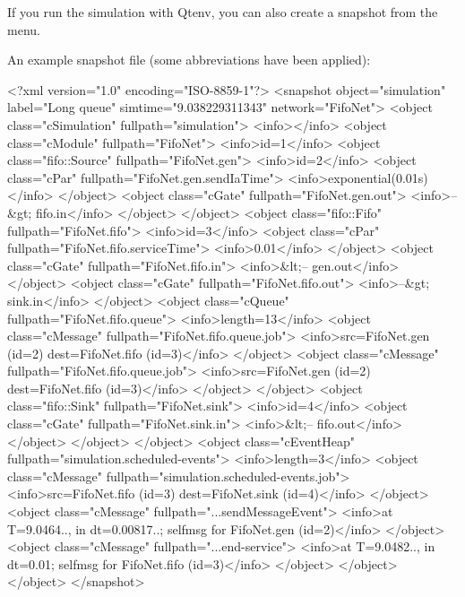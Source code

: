 If you run the simulation with Qtenv, you can also create a
snapshot from the menu.

An example snapshot file (some abbreviations have been applied):

\begin{xml}
<?xml version="1.0" encoding="ISO-8859-1"?>
<snapshot object="simulation" label="Long queue" simtime="9.038229311343"
network="FifoNet">
  <object class="cSimulation" fullpath="simulation">
    <info></info>
    <object class="cModule" fullpath="FifoNet">
      <info>id=1</info>
      <object class="fifo::Source" fullpath="FifoNet.gen">
        <info>id=2</info>
        <object class="cPar" fullpath="FifoNet.gen.sendIaTime">
          <info>exponential(0.01s)</info>
        </object>
        <object class="cGate" fullpath="FifoNet.gen.out">
          <info>--&gt; fifo.in</info>
        </object>
      </object>
      <object class="fifo::Fifo" fullpath="FifoNet.fifo">
        <info>id=3</info>
        <object class="cPar" fullpath="FifoNet.fifo.serviceTime">
          <info>0.01</info>
        </object>
        <object class="cGate" fullpath="FifoNet.fifo.in">
          <info>&lt;-- gen.out</info>
        </object>
        <object class="cGate" fullpath="FifoNet.fifo.out">
          <info>--&gt; sink.in</info>
        </object>
        <object class="cQueue" fullpath="FifoNet.fifo.queue">
          <info>length=13</info>
          <object class="cMessage" fullpath="FifoNet.fifo.queue.job">
            <info>src=FifoNet.gen (id=2)  dest=FifoNet.fifo (id=3)</info>
          </object>
          <object class="cMessage" fullpath="FifoNet.fifo.queue.job">
            <info>src=FifoNet.gen (id=2)  dest=FifoNet.fifo (id=3)</info>
          </object>
        </object>
      <object class="fifo::Sink" fullpath="FifoNet.sink">
        <info>id=4</info>
        <object class="cGate" fullpath="FifoNet.sink.in">
          <info>&lt;-- fifo.out</info>
        </object>
      </object>
    </object>
    <object class="cEventHeap" fullpath="simulation.scheduled-events">
      <info>length=3</info>
      <object class="cMessage" fullpath="simulation.scheduled-events.job">
        <info>src=FifoNet.fifo (id=3)  dest=FifoNet.sink (id=4)</info>
      </object>
      <object class="cMessage" fullpath="...sendMessageEvent">
        <info>at T=9.0464.., in dt=0.00817..; selfmsg for FifoNet.gen (id=2)</info>
      </object>
      <object class="cMessage" fullpath="...end-service">
        <info>at T=9.0482.., in dt=0.01; selfmsg for FifoNet.fifo (id=3)</info>
      </object>
    </object>
  </object>
</snapshot>

\end{xml}



